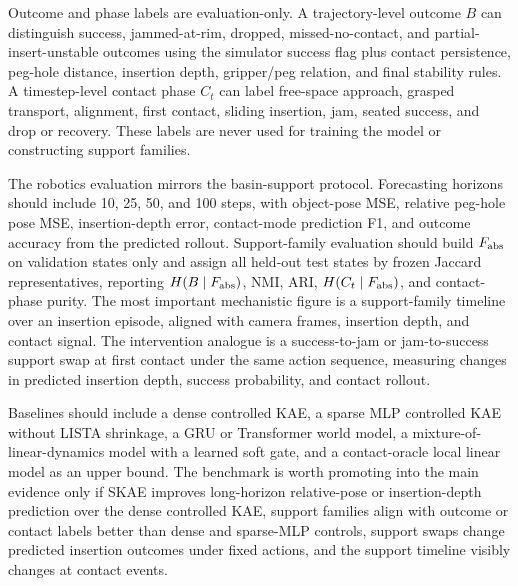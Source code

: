 Outcome and phase labels are evaluation-only. A trajectory-level outcome \(B\) can distinguish success, jammed-at-rim, dropped, missed-no-contact, and partial-insert-unstable outcomes using the simulator success flag plus contact persistence, peg-hole distance, insertion depth, gripper/peg relation, and final stability rules. A timestep-level contact phase \(C_t\) can label free-space approach, grasped transport, alignment, first contact, sliding insertion, jam, seated success, and drop or recovery. These labels are never used for training the model or constructing support families.

The robotics evaluation mirrors the basin-support protocol. Forecasting horizons should include 10, 25, 50, and 100 steps, with object-pose MSE, relative peg-hole pose MSE, insertion-depth error, contact-mode prediction F1, and outcome accuracy from the predicted rollout. Support-family evaluation should build \(F_{\rm abs}\) on validation states only and assign all held-out test states by frozen Jaccard representatives, reporting \(H(B\mid F_{\rm abs})\), NMI, ARI, \(H(C_t\mid F_{\rm abs})\), and contact-phase purity. The most important mechanistic figure is a support-family timeline over an insertion episode, aligned with camera frames, insertion depth, and contact signal. The intervention analogue is a success-to-jam or jam-to-success support swap at first contact under the same action sequence, measuring changes in predicted insertion depth, success probability, and contact rollout.

Baselines should include a dense controlled KAE, a sparse MLP controlled KAE without LISTA shrinkage, a GRU or Transformer world model, a mixture-of-linear-dynamics model with a learned soft gate, and a contact-oracle local linear model as an upper bound. The benchmark is worth promoting into the main evidence only if SKAE improves long-horizon relative-pose or insertion-depth prediction over the dense controlled KAE, support families align with outcome or contact labels better than dense and sparse-MLP controls, support swaps change predicted insertion outcomes under fixed actions, and the support timeline visibly changes at contact events.
